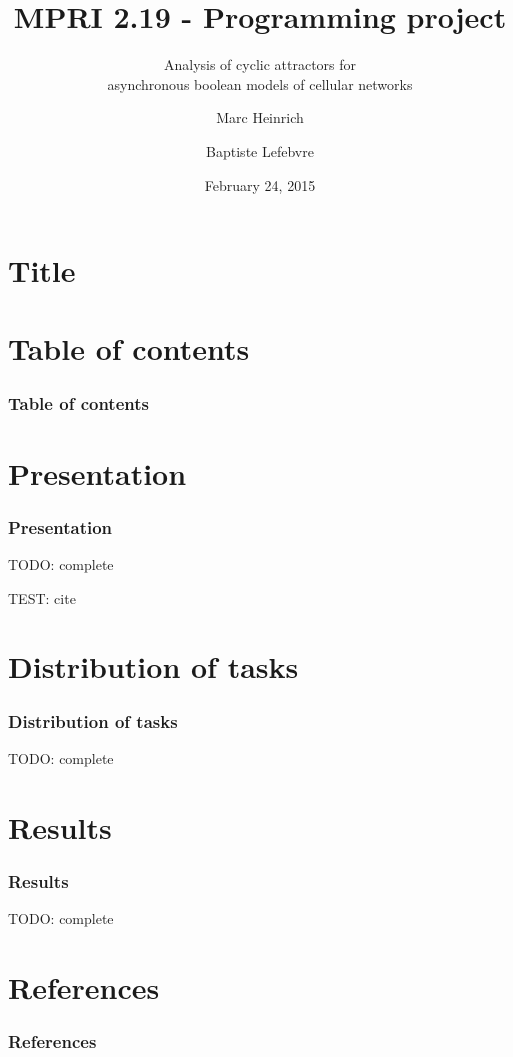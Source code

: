 \documentclass{beamer}
\title{MPRI 2.19 - Programming project}
\subtitle{Analysis of cyclic attractors for \\ asynchronous boolean models of cellular networks}
\author{Marc Heinrich \and Baptiste Lefebvre}
\institute{École Normale Supérieure, Computer Science Department}
\date{February 24, 2015}
\begin{document}
\section*{Title}

\begin{frame}
  \titlepage
\end{frame}


\section*{Table of contents}

\begin{frame}
  \frametitle{Table of contents}
  \tableofcontents
\end{frame} 



\section{Presentation}

\begin{frame}
  \frametitle{Presentation}
  TODO: complete
  
  TEST: cite \cite{Bonzanni}
\end{frame}



\section{Distribution of tasks}

\begin{frame}
  \frametitle{Distribution of tasks}
  TODO: complete
\end{frame}



\section{Results}

\begin{frame}
  \frametitle{Results}
  TODO: complete
\end{frame}


\section*{References}

\begin{frame}
  \frametitle{References}
  
  
\end{frame}
\end{document}
